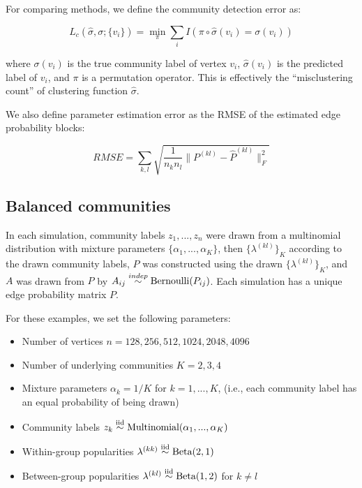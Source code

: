 \documentclass[12pt]{article}
\providecommand{\tightlist}{%
  \setlength{\itemsep}{0pt}\setlength{\parskip}{0pt}}
\begin{document}
For comparing methods, we define the community detection error as:

\[L_c(\hat{\sigma}, \sigma; \{v_i\}) =
\min_\pi \sum_i I(\pi \circ \hat{\sigma}(v_i) = \sigma(v_i))\]

where \(\sigma(v_i)\) is the true community label of vertex \(v_i\),
\(\hat{\sigma}(v_i)\) is the predicted label of \(v_i\), and \(\pi\) is
a permutation operator. This is effectively the ``misclustering count''
of clustering function \(\hat{\sigma}\).

We also define parameter estimation error as the RMSE
of the estimated edge probability blocks:

\[RMSE =
\sum_{k,l} \sqrt{\frac{1}{n_k n_l} \|P^{(kl)} - \hat{P}^{(kl)}\|_F^2}\]

\hypertarget{balanced-communities}{%
\subsection{Balanced communities}\label{balanced-communities}}

In each simulation, community labels \(z_1, ..., z_n\) were drawn from a
multinomial distribution with mixture parameters
\(\{\alpha_1, ..., \alpha_K\}\), then \(\{\lambda^{(kl)}\}_K\) according
to the drawn community labels, \(P\) was constructed using the drawn
\(\{\lambda^{(kl)}\}_K\), and \(A\) was drawn from \(P\) by
\(A_{ij} \stackrel{indep}{\sim} \text{Bernoulli}(P_{ij})\). Each simulation has
a unique edge probability matrix \(P\).

For these examples, we set the following parameters:

\begin{itemize}
\tightlist
\item
  Number of vertices \(n = 128, 256, 512, 1024, 2048, 4096\)
\item
  Number of underlying communities \(K = 2, 3, 4\)
\item
  Mixture parameters \(\alpha_k = 1 / K\) for \(k = 1, ..., K\), (i.e.,
  each community label has an equal probability of being drawn)
\item
  Community labels
  \(z_k \stackrel{\text{iid}}{\sim} \text{Multinomial}(\alpha_1, ..., \alpha_K)\)
\item
  Within-group popularities
  \(\lambda^{(kk)} \stackrel{\text{iid}}{\sim} \text{Beta}(2, 1)\)
\item
  Between-group popularities
  \(\lambda^{(kl)} \stackrel{\text{iid}}{\sim} \text{Beta}(1, 2)\) for
  \(k \neq l\)
\end{itemize}
\end{document}
